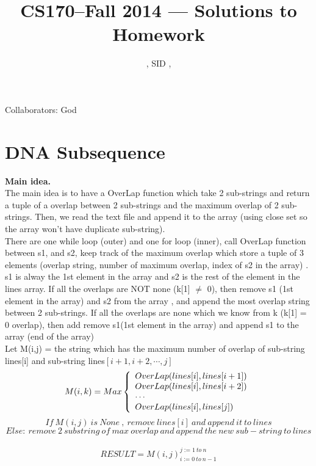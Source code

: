 \documentclass[11pt]{article}
\title{CS170--Fall 2014 --- Solutions to Homework \Homework}
\author{\Name, SID \SID, \texttt{\Login}}
\begin{document}
\maketitle

\noindent
Collaborators: God


\section*{DNA Subsequence}
\noindent
\textbf{Main idea.}\\
The main idea is to have a OverLap function which take 2 sub-strings and return a tuple of a overlap between 2 sub-strings and the maximum overlap of 2 sub-strings. Then, we read the text file and append it to the array (using close set so the array won't have duplicate sub-string).\\
There are one while loop (outer) and one for loop (inner), call OverLap function between s1, and s2, keep track of the maximum overlap which store a tuple of 3 elements (overlap string, number of maximum overlap, index of s2 in the array) . s1 is alway the 1st element in the array and s2 is the rest of the element in the lines array. If all the overlaps are NOT none (k[1] $\neq$ 0), then remove s1 (1st element in the array) and s2 from the array , and append the most overlap string between 2 sub-strings. If all the overlaps are none which we know from k (k[1] = 0 overlap), then add remove s1(1st element in the array) and append s1 to the array (end of the array)\\

Let M(i,j) = the string which has the maximum number of overlap of sub-string lines[i] and sub-string lines$[i+1,i+2,\cdots, j]$\\
\[ M(i,k) = Max \left\{ 
  \begin{array}{l l}
   OverLap(lines[i], lines[i+1])\\
   OverLap(lines[i], lines[i+2])\\
   \cdots\\
   OverLap(lines[i], lines[j])\\	
  \end{array} \right.\]
$$If\ M(i,j)\ is\ None\ ,\ remove\ lines[i]\ and\ append\ it\ to\ lines$$
$$Else:\ remove\ 2\ substring\ of\ max\ overlap\ and\ append\ the\ new\ sub-string\ to\ lines $$
\\
$$RESULT = M(i,j)_{i:= 0\ to\ n-1} ^{j:= 1\ to\ n} $$
\end{document}
